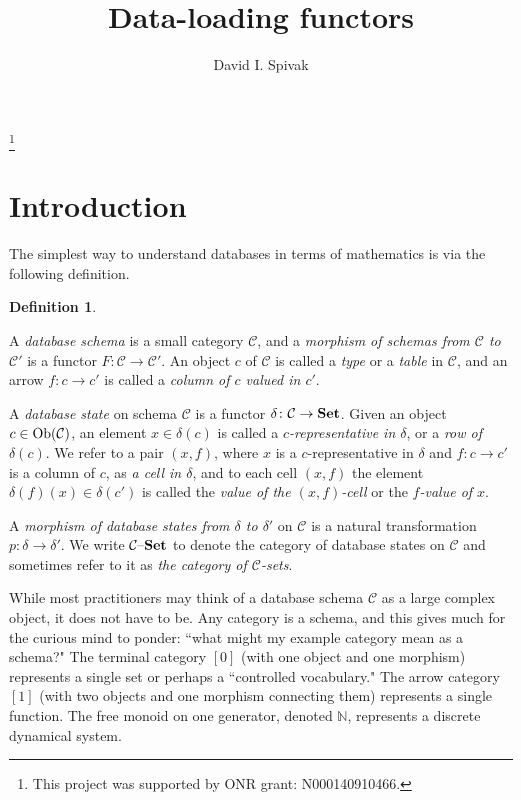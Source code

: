 \documentclass{amsart}
\def\tn{\textnormal}
\def\mc{\mathcal}
\def\NN{{\mathbb N}}
\def\Ob{\tn{Ob}}
\def\to{\rightarrow}
\def\taking{\colon}
\def\Set{{\bf Set}}
\def\set{{\text \textendash}{\bf Set}}
\def\mcC{\mc{C}}
\theoremstyle{remark}
\theoremstyle{definition}
\newtheorem{definition}[theorem]{Definition}
\begin{document}
\title{Data-loading functors}

\author{David I. Spivak}

\thanks{This project was supported by ONR grant: N000140910466.}

\maketitle

\section{Introduction}

The simplest way to understand databases in terms of mathematics is via the following definition.

\begin{definition} \label{def:basic}

A {\em database schema} is a small category $\mcC$, and a {\em morphism of schemas from $\mcC$ to $\mcC'$} is a functor $F\taking\mcC\to\mcC'$.   An object $c$ of $\mcC$ is called a {\em type} or a {\em table} in $\mcC$, and an arrow $f\taking c\to c'$ is called a {\em column of $c$ valued in $c'$}.

A {\em database state} on schema $\mcC$ is a functor $\delta\taking\mcC\to\Set$.   Given an object $c\in\Ob(\mcC)$, an element $x\in\delta(c)$ is called a {\em $c$-representative in $\delta$}, or a {\em row of $\delta(c)$}.  We refer to a pair $(x,f)$, where $x$ is a $c$-representative in $\delta$ and $f\taking c\to c'$ is a column of $c$, as {\em a cell in $\delta$}, and to each cell $(x,f)$ the element $\delta(f)(x)\in\delta(c')$ is called the {\em value of the $(x,f)$-cell} or the {\em $f$-value of $x$}.

A {\em morphism of database states from $\delta$ to $\delta'$} on $\mcC$ is a natural transformation $p\taking\delta\to\delta'$.  We write $\mcC\set$ to denote the category of database states on $\mcC$ and sometimes refer to it as {\em the category of $\mcC$-sets}. 

\end{definition}

While most practitioners may think of a database schema $\mcC$ as a large complex object, it does not have to be.  Any category is a schema, and this gives much for the curious mind to ponder: ``what might my example category mean as a schema?"  The terminal category $[0]$ (with one object and one morphism) represents a single set or perhaps a ``controlled vocabulary."  The arrow category $[1]$ (with two objects and one morphism connecting them) represents a single function.  The free monoid on one generator, denoted $\NN$, represents a discrete dynamical system.
\end{document}
